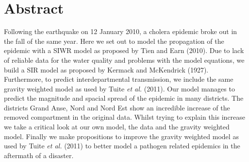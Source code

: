 \documentclass[11pt]{article}
\begin{document}






\section*{Abstract}
Following the earthquake on 12 January 2010, a cholera epidemic broke out in the fall of the same year. Here we set out to model the propagation of the epidemic with a SIWR model as proposed by Tien and Earn (2010). Due to lack of reliable data for the water quality and problems with the model equations, we build a SIR model as proposed by Kermack and McKendrick (1927). Furthermore, to predict interdepartmental transmission, we include the same gravity weighted model as used by Tuite \textit{et al.} (2011). Our model manages to predict the magnitude and spacial spread of the epidemic in many districts. The districts Grand Anse, Nord and Nord Est show an incredible increase of the removed compartment in the original data. Whilst trying to explain this increase we take a critical look at our own model, the data and the gravity weighted model. Finally we make propositions to improve the gravity weighted model as used by Tuite \textit{et al.} (2011) to better model a pathogen related epidemics in the aftermath of a disaster. 



\newpage


\tableofcontents

\newpage













\newpage
\end{document}
